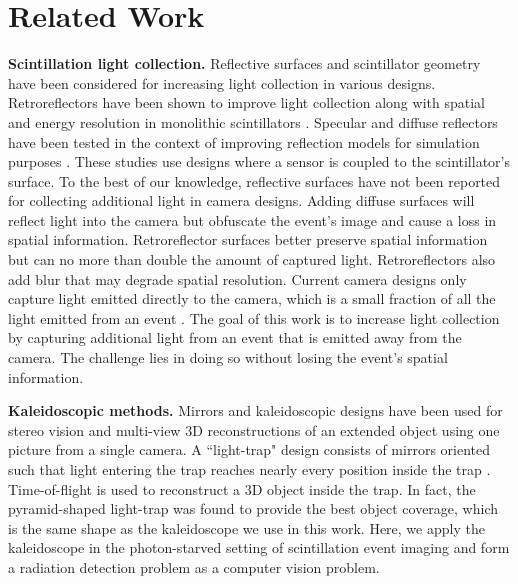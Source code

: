 \section{Related Work}

\textbf{Scintillation light collection.} Reflective surfaces and scintillator geometry have been considered for increasing 
light collection in various designs.
Retroreflectors have been shown to improve light collection along with spatial 
and energy resolution in monolithic scintillators \cite{mcelroy2002use,heemskerk2009micro,ros2014retroreflector,gonzalez2017performance}.
Specular and diffuse reflectors have been tested in the context of improving 
reflection models for simulation purposes \cite{janecek2010simulating,roncali2017integrated,trigila2021optimization}.
These studies use designs where a sensor is coupled to the scintillator's surface.
To the best of our knowledge, reflective surfaces have not been reported for 
collecting additional light in camera designs.
Adding diffuse surfaces will reflect light into the camera but obfuscate the 
event's image and cause a loss in spatial information.
Retroreflector surfaces better preserve spatial information but can no more than 
double the amount of captured light.
Retroreflectors also add blur that may degrade spatial resolution.
Current camera designs only capture light emitted directly to the camera,
which is a small fraction of all the light emitted from an event 
\cite{bocchieri2024scintillation, yamamoto2023development, d2021novel, gao2023novel, losko2021new,adams2017gamma,balasubramanian2022x,gustschin2024event}.
The goal of this work is to increase light collection by capturing additional 
light from an event that is emitted away from the camera.
The challenge lies in doing so without losing the event's spatial information.

\noindent
\textbf{Kaleidoscopic methods.} Mirrors and kaleidoscopic designs have been used for stereo vision \cite{nene1998stereo, gluckman1999planar, gluckman2002rectified} 
and multi-view 3D reconstructions \cite{reshetouski2011three, ahn2021kaleidoscopic, ahn2023neural, takahashi2021structure, bangay2004kaleidoscope, mitsumoto19923}
of an extended object using one picture from a single camera.
A ``light-trap" design consists of mirrors oriented such that light entering the 
trap reaches nearly every position inside the trap \cite{xu2018trapping}.
Time-of-flight is used to reconstruct a 3D object inside the trap.
In fact, the pyramid-shaped light-trap was found to provide the best object 
coverage, which is the same shape as the kaleidoscope we use in this work.
Here, we apply the kaleidoscope in the photon-starved setting of scintillation 
event imaging and form a radiation detection problem as a computer vision problem.

